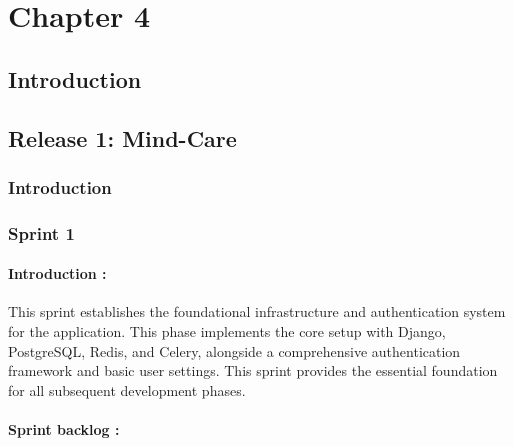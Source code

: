 \chapter{Chapter 4}
\section{Introduction}
\section{Release 1: Mind-Care}
\subsection{Introduction}
\subsection{Sprint 1}
\subsubsection{Introduction :}
This sprint establishes the foundational infrastructure and authentication system for the application. This phase implements the core setup with Django, PostgreSQL, Redis, and Celery, alongside a comprehensive authentication framework and basic user settings.
This sprint provides the essential foundation for all subsequent development phases.
\subsubsection{Sprint backlog :}

